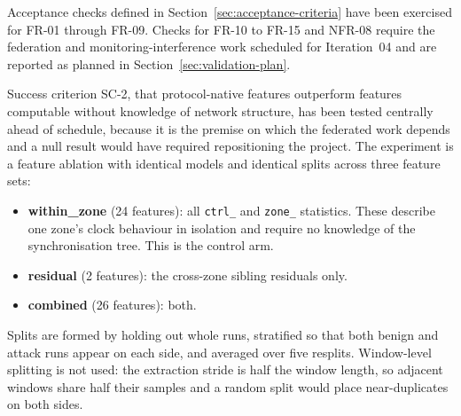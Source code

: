 Acceptance checks defined in Section~\ref{sec:acceptance-criteria} have been exercised for FR-01 through FR-09.
Checks for FR-10 to FR-15 and NFR-08 require the federation and
monitoring-interference work scheduled for Iteration~04 and are reported as planned in
Section~\ref{sec:validation-plan}.

Success criterion SC-2, that protocol-native features outperform features computable
without knowledge of network structure, has been tested centrally ahead of schedule,
because it is the premise on which the federated work depends and a null result would
have required repositioning the project. The experiment is a feature ablation with
identical models and identical splits across three feature sets:

\begin{itemize}
  \item \textbf{within\_zone} (24 features): all \texttt{ctrl\_} and \texttt{zone\_}
        statistics. These describe one zone's clock behaviour in isolation and require
        no knowledge of the synchronisation tree. This is the control arm.
  \item \textbf{residual} (2 features): the cross-zone sibling residuals only.
  \item \textbf{combined} (26 features): both.
\end{itemize}

Splits are formed by holding out whole runs, stratified so that both benign and attack
runs appear on each side, and averaged over five resplits. Window-level splitting is
not used: the extraction stride is half the window length, so adjacent windows share
half their samples and a random split would place near-duplicates on both sides.

